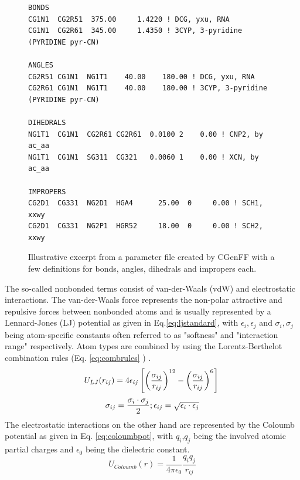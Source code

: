 \documentclass[oneside]{scrreprt}
\begin{document}
\begin{figure}
\small
\begin{verbatim}
BONDS
CG1N1  CG2R51  375.00     1.4220 ! DCG, yxu, RNA
CG1N1  CG2R61  345.00     1.4350 ! 3CYP, 3-pyridine (PYRIDINE pyr-CN)

ANGLES
CG2R51 CG1N1  NG1T1    40.00    180.00 ! DCG, yxu, RNA
CG2R61 CG1N1  NG1T1    40.00    180.00 ! 3CYP, 3-pyridine (PYRIDINE pyr-CN)

DIHEDRALS
NG1T1  CG1N1  CG2R61 CG2R61  0.0100 2    0.00 ! CNP2, by ac_aa
NG1T1  CG1N1  SG311  CG321   0.0060 1    0.00 ! XCN, by ac_aa

IMPROPERS
CG2D1  CG331  NG2D1  HGA4      25.00  0     0.00 ! SCH1, xxwy
CG2D1  CG331  NG2P1  HGR52     18.00  0     0.00 ! SCH2, xxwy

\end{verbatim}
   \caption{Illustrative excerpt from a parameter file created by CGenFF with a few definitions for bonds, angles, dihedrals and impropers each.}
    \label{fig:parmfile}
\end{figure}






The so-called nonbonded terms consist of van-der-Waals (vdW) and electrostatic interactions.
The van-der-Waals force represents the non-polar attractive and repulsive forces between nonbonded atoms and is usually represented by a Lennard-Jones (LJ) potential as given in Eq.\ref{eq:ljstandard}, with $\epsilon_i, \epsilon_j$ and $\sigma_i, \sigma_j$ being atom-specific constants often referred to as "softness" and "interaction range" respectively. Atom types are combined by using the Lorentz-Berthelot combination rules (Eq. \ref{eq:combrules} \cite{orabiCorrectionsCHARMM36Parametrization2021,jensen_introduction_2017}) .
\begin{equation}
U_{LJ}(r_{ij})=4\epsilon_{ij}\left[\left(\frac{\sigma_{ij}}{r_{ij}}\right)^{12} - \left(\frac{\sigma_{ij}}{r_{ij}}\right)^6\right] \label{eq:ljstandard} \\
\end{equation}
\begin{equation}
\sigma_{ij}=\frac{\sigma_i\cdot \sigma_j}{2}; \epsilon_{ij}=\sqrt{\epsilon_i \cdot \epsilon_j} \label{eq:combrules} \\
\end{equation}
The electrostatic interactions on the other hand are represented by the Coloumb potential as given in Eq. \ref{eq:coloumbpot}, with $q_i$,$q_j$ being the involved atomic partial charges and $\epsilon_0$ being the dielectric constant.
\begin{equation}\label{eq:coloumbpot}
    U_{Coloumb}(r)=\frac{1}{4 \pi \epsilon_0}\frac{q_i q_j}{r_{ij}}
\end{equation}
\end{document}
